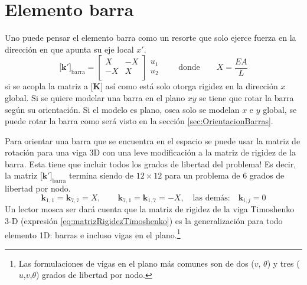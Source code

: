 \documentclass[11pt, a4paper,titlepage]{article}
\newcommand{\Mme}[1]{\boldsymbol{[}\mathbf{#1} \boldsymbol{]}}
\newcommand{\MK}{\Mme{K}}
\begin{document}
\section{Elemento barra}
Uno puede pensar el elemento barra como un resorte que solo ejerce fuerza en la dirección en que apunta su eje local $x'$.
\begin{equation} \label{eq:matrizBarra}
\Mme{k'}_{\mathrm{barra}} = \begin{bmatrix}
X & -X \\ 
-X & X\\
\end{bmatrix}\begin{array}{c}
u_1\\
u_2 
\end{array} \qquad \text{donde}\qquad X=\frac{EA}{L}
\end{equation}
si se acopla la matriz a $\MK$ así como está solo otorga rigidez en la dirección $x$ global. Si se quiere modelar una barra en el plano $xy$ se tiene que rotar la barra según su orientación. Si el modelo es plano, osea solo se modelan $x$ e $y$ global, se puede rotar la barra como será visto en la sección \ref{sec:OrientacionBarras}. 

Para orientar una barra que se encuentra en el espacio se puede usar la matriz de rotación para una viga 3D con una leve modificación a la matriz de rigidez de la barra. Esta tiene que incluir todos los grados de libertad del problema! Es decir, la matriz $\Mme{k'}_{\mathrm{barra}}$ termina siendo de $12 \times 12$ para un problema de 6 grados de libertad por nodo.
\[
\mathbf{k}_{1,1}=\mathbf{k}_{7,7}=X, \qquad \mathbf{k}_{7,1}=\mathbf{k}_{1,7}=-X, \quad \text{las demás:} \quad \mathbf{k}_{i,j} = 0
\]
Un lector mosca ser dará cuenta que la matriz de rigidez de la viga Timoshenko 3-D (expresión \ref{eq:matrizRigidezTimoshenko}) es la generalización para todo elemento 1D: barras e incluso vigas en el plano.\footnote{Las formulaciones de vigas en el plano más comunes son de dos ($v$, $\theta$) y tres ($u$,$v$,$\theta$) grados de libertad por nodo.}
\end{document}
